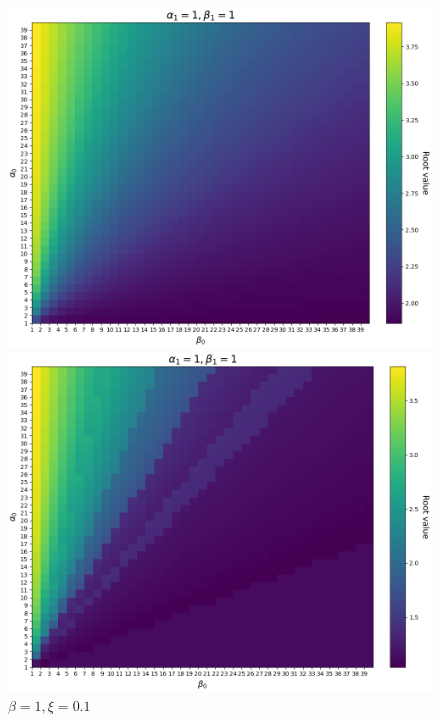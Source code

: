 \documentclass{article}
\begin{document}
\begin{figure}[ht!]
    \begin{minipage}{0.49\textwidth}
        \centering
        \includegraphics[width=1\textwidth]{../../../../bandit/data/convergence/num_replays/temp1/value_horizon4_alpha1_beta1_xi0001_temp1.png}
        \caption{$\beta=1, \xi=0.001$}
    \end{minipage}%
    \begin{minipage}{0.49\textwidth}
        \centering
        \includegraphics[width=1\textwidth]{../../../../bandit/data/convergence/num_replays/temp1/value_horizon4_alpha1_beta1_xi01_temp1.png}
        \caption{$\beta=1, \xi=0.1$}
    \end{minipage}
\end{figure}
\end{document}
